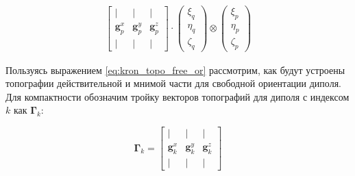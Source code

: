 \begin{multline}
    \begin{bmatrix}
        |                 & |              & |              \\
        \mathbf{g}_p^x    & \mathbf{g}_p^y & \mathbf{g}_p^z \\
        |                 & |              & |
    \end{bmatrix}
    \cdot
    \left(\begin{array}{ccc}
            \xi_q\\
            \eta_q\\
            \zeta_q
        \end{array}
    \right)
    \otimes
    \left(\begin{array}{ccc}
            \xi_p\\
            \eta_p\\
            \zeta_p
        \end{array}
    \right)
    \label{eq:kron_topo_free_or}
\end{multline}

Пользуясь выражением \ref{eq:kron_topo_free_or} рассмотрим, как будут устроены топографии
действительной и мнимой части для свободной ориентации диполя. Для компактности
обозначим тройку векторов топографий для диполя с индексом $k$ как $\mathbf{\mathbf{\Gamma}}_k$:

\begin{equation}
    \mathbf{\Gamma}_k =
    \begin{bmatrix}
        |                 & |              & |              \\
        \mathbf{g}_k^x    & \mathbf{g}_k^y & \mathbf{g}_k^z \\
        |                 & |              & |
    \end{bmatrix}
\end{equation}


